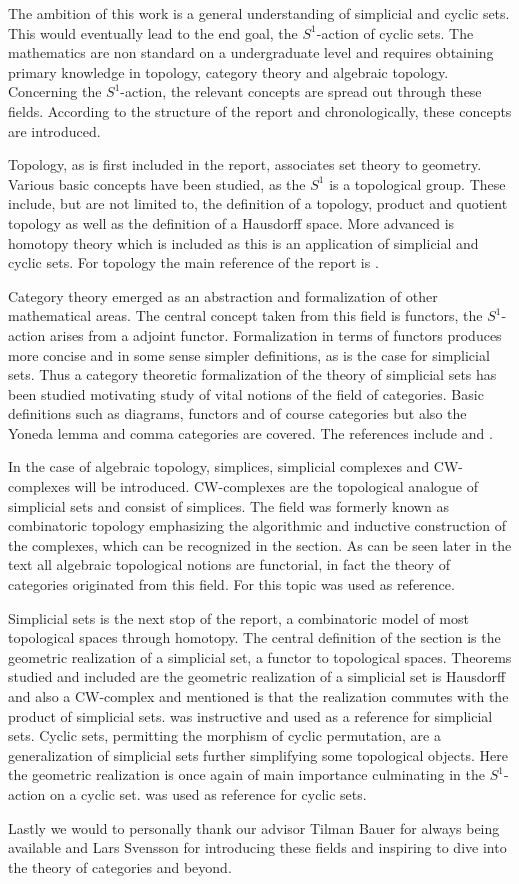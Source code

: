 \documentclass[../../main.tex]{subfiles}
\begin{document}
    The ambition of this work is a general understanding of simplicial and cyclic sets. This would eventually lead to the end goal, the $S^1$-action of cyclic sets. The mathematics are non standard on a undergraduate level and requires obtaining primary knowledge in topology, category theory and algebraic topology. Concerning the $S^1$-action, the relevant concepts are spread out through these fields. According to the structure of the report and chronologically, these concepts are introduced. 

    Topology, as is first included in the report, associates set theory to geometry. Various basic concepts have been studied, as the $S^1$ is a topological group. These include, but are not limited to, the definition of a topology, product and quotient topology as well as the definition of a Hausdorff space. More advanced is homotopy theory which is included as this is an application of simplicial and cyclic sets. For topology the main reference of the report is \cite{armstrong-basictop}.    

    Category theory emerged as an abstraction and formalization of other mathematical areas. The central concept taken from this field is functors, the $S^1$-action arises from a adjoint functor. Formalization in terms of functors produces more concise and in some sense simpler definitions, as is the case for simplicial sets. Thus a category theoretic formalization of the theory of simplicial sets has been studied motivating study of vital notions of the field of categories. Basic definitions such as diagrams, functors and of course categories but also the Yoneda lemma and comma categories are covered. The references include \cite{simp-may} and \cite{cate-mac}.

    In the case of algebraic topology, simplices, simplicial complexes and CW-complexes will be introduced. CW-complexes are the topological analogue of simplicial sets and consist of simplices. The field was formerly known as combinatoric topology emphasizing the algorithmic and inductive construction of the complexes, which can be recognized in the section. As can be seen later in the text all algebraic topological notions are functorial, in fact the theory of categories originated from this field. For this topic \cite{simp-may} was used as reference.

    Simplicial sets is the next stop of the report, a combinatoric model of most topological spaces through homotopy. The central definition of the section is the geometric realization of a simplicial set, a functor to topological spaces. Theorems studied and included are the geometric realization of a simplicial set is Hausdorff and also a CW-complex and mentioned is that the realization commutes with the product of simplicial sets. \cite{luk-simp} was instructive and used as a reference for simplicial sets. Cyclic sets, permitting the morphism of cyclic permutation, are a generalization of simplicial sets further simplifying some topological objects. Here the geometric realization is once again of main importance culminating in the $S^1$-action on a cyclic set. \cite{loday-cyclic} was used as reference for cyclic sets.

    Lastly we would to personally thank our advisor Tilman Bauer for always being available and Lars Svensson for introducing these fields and inspiring to dive into the theory of categories and beyond.
    
\end{document}
